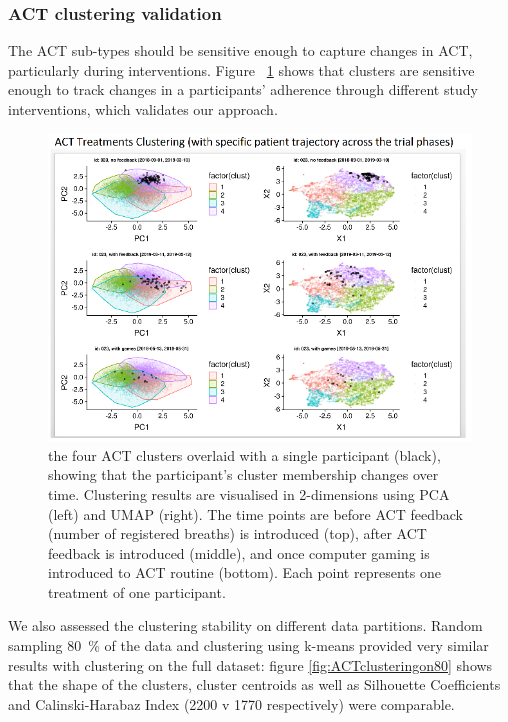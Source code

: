\documentclass{article}
\begin{document}
\subsubsection{ACT clustering validation}

The ACT sub-types should be sensitive enough to capture changes in ACT, particularly during interventions. Figure ~\ref{fig:act_res} shows that clusters are sensitive enough to track changes in a participants' adherence through different study interventions, which validates our approach.

\begin{figure}[!htb]
  \centering
  \includegraphics[]{fig_ACT_clust}
  \caption{the four ACT clusters overlaid with a single participant (black), showing that the participant’s cluster membership changes over time. Clustering results are visualised in 2-dimensions using PCA (left) and UMAP (right). The time points are before ACT feedback (number of registered breaths) is introduced (top), after ACT feedback is introduced (middle), and once computer gaming is introduced to ACT routine (bottom). Each point represents one treatment of one participant. }
  \label{fig:act_res}
\end{figure}

We also assessed the clustering stability on different data partitions. Random sampling 80~\% of the data and clustering using k-means provided very similar results with clustering on the full dataset: figure \ref{fig:ACTclusteringon80} shows that the shape of the clusters, cluster centroids as well as Silhouette Coefficients and Calinski-Harabaz Index (2200 v 1770 respectively) were comparable. 
\end{document}
